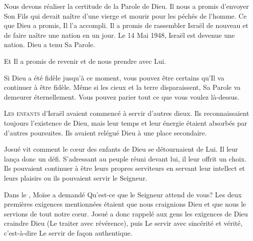Nous devons réaliser la certitude de la Parole de Dieu.
 Il nous a promis d'envoyer Son Fils qui devait naître
 d'une vierge et mourir pour les péchés de l'homme.
 Ce que Dieu a promis, Il l'a accompli.
 Il a promis de rassembler Israël de nouveau
 et de faire naître une nation en un jour.
 Le 14 Mai 1948, Israël est devenue une nation. Dieu a tenu Sa Parole.

Et Il a promis de revenir et de nous prendre avec Lui.

Si Dieu a été fidèle jusqu'à ce moment, vous pouvez être certains
 qu'Il va continuer à être fidèle. Même si les cieux et la terre disparaissent,
 Sa Parole va demeurer éternellement.
 Vous pouvez parier tout ce que vous voulez là-dessus. 

\dvrule






\lettrine{L}{es enfants} d'Israël avaient commencé à servir d'autres dieux.
 Ils reconnaissaient toujours l'existence de Dieu, mais leur temps
 et leur énergie étaient absorbés par d'autres poursuites.
 Ils avaient relégué Dieu à une place secondaire.

Josué vit comment le c\oe{}ur des enfants de Dieu se détournaient de Lui.
 Il leur lan\c{c}a donc un défi. S'adressant au peuple réuni devant lui,
 il leur offrit un choix. Ils pouvaient continuer à être
 leurs propres serviteurs
 \ocadr en servant leur intellect et leurs plaisirs \fcadr{}
 ou ils pouvaient servir le Seigneur.


Dans le , Moïse a demandé\frcolon
 \Og Qu'est-ce que le Seigneur attend de vous? \Fg{}
 Les deux premières exigences mentionnées
 étaient que nous craignions Dieu et que nous le servions de tout notre c\oe{}ur.
 Josué a donc rappelé aux gens les exigences de Dieu\frcolon
 craindre Dieu (Le traiter avec révérence),
 puis Le servir avec sincérité et vérité,
 c'est-à-dire Le servir de fa\c{c}on authentique.

